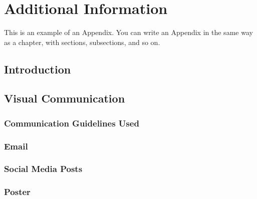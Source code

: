 
\chapter{Additional Information}
This is an example of an Appendix. You can write an Appendix in the same way as a chapter, with sections, subsections, and so on.

\section{Introduction}

\section{Visual Communication}

\subsection{Communication Guidelines Used}

\subsection{Email}

\subsection{Social Media Posts}

\subsection{Poster}

